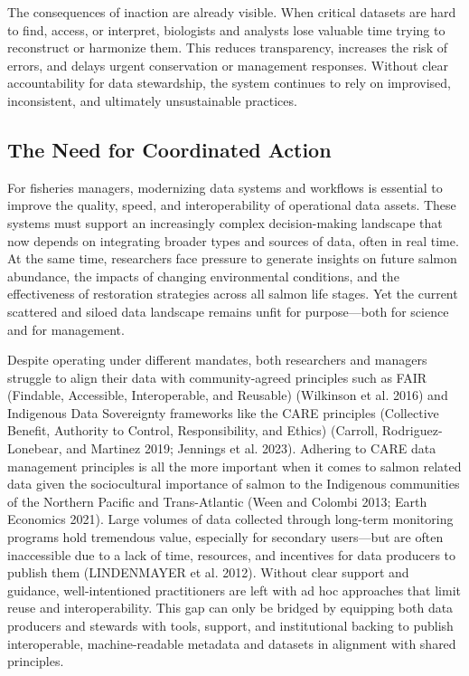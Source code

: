 \documentclass[
  letterpaper,
  DIV=11,
  numbers=noendperiod]{scrartcl}
\begin{document}
The consequences of inaction are already visible. When critical datasets
are hard to find, access, or interpret, biologists and analysts lose
valuable time trying to reconstruct or harmonize them. This reduces
transparency, increases the risk of errors, and delays urgent
conservation or management responses. Without clear accountability for
data stewardship, the system continues to rely on improvised,
inconsistent, and ultimately unsustainable practices.

\subsection{The Need for Coordinated
Action}\label{the-need-for-coordinated-action}

For fisheries managers, modernizing data systems and workflows is
essential to improve the quality, speed, and interoperability of
operational data assets. These systems must support an increasingly
complex decision-making landscape that now depends on integrating
broader types and sources of data, often in real time. At the same time,
researchers face pressure to generate insights on future salmon
abundance, the impacts of changing environmental conditions, and the
effectiveness of restoration strategies across all salmon life stages.
Yet the current scattered and siloed data landscape remains unfit for
purpose---both for science and for management.

Despite operating under different mandates, both researchers and
managers struggle to align their data with community-agreed principles
such as FAIR (Findable, Accessible, Interoperable, and Reusable)
(Wilkinson et al. 2016) and Indigenous Data Sovereignty frameworks like
the CARE principles (Collective Benefit, Authority to Control,
Responsibility, and Ethics) (Carroll, Rodriguez-Lonebear, and Martinez
2019; Jennings et al. 2023). Adhering to CARE data management principles
is all the more important when it comes to salmon related data given the
sociocultural importance of salmon to the Indigenous communities of the
Northern Pacific and Trans-Atlantic (Ween and Colombi 2013; Earth
Economics 2021). Large volumes of data collected through long-term
monitoring programs hold tremendous value, especially for secondary
users---but are often inaccessible due to a lack of time, resources, and
incentives for data producers to publish them (LINDENMAYER et al. 2012).
Without clear support and guidance, well-intentioned practitioners are
left with ad hoc approaches that limit reuse and interoperability. This
gap can only be bridged by equipping both data producers and stewards
with tools, support, and institutional backing to publish interoperable,
machine-readable metadata and datasets in alignment with shared
principles.
\end{document}
